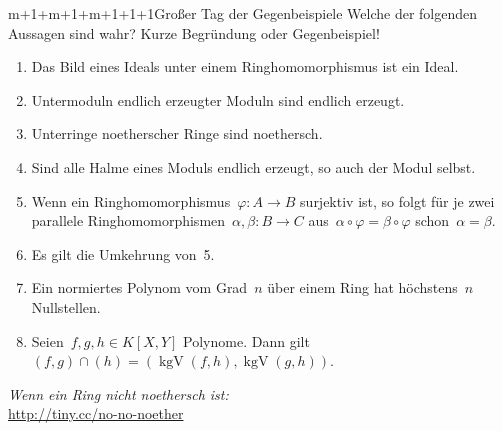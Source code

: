 \documentclass{uebblatt}
\begin{document}
\begin{aufgabe}{m+1+m+1+m+1+1+1}{Großer Tag der Gegenbeispiele}
Welche der folgenden Aussagen sind wahr? Kurze Begründung oder Gegenbeispiel!
\renewcommand{\labelenumi}{\arabic{enumi}.}
\begin{enumerate}
\item Das Bild eines Ideals unter einem Ringhomomorphismus ist ein Ideal.
\item Untermoduln endlich erzeugter Moduln sind endlich erzeugt.
\item Unterringe noetherscher Ringe sind noethersch.
\item Sind alle Halme eines Moduls endlich erzeugt, so auch der Modul selbst.
\item Wenn ein Ringhomomorphismus~$\varphi : A \to B$ surjektiv ist, so folgt
für je zwei parallele Ringhomomorphismen~$\alpha, \beta : B \to C$ aus~$\alpha
\circ \varphi = \beta \circ \varphi$ schon~$\alpha = \beta$.
\item Es gilt die Umkehrung von~5.
\item Ein normiertes Polynom vom Grad~$n$ über einem Ring hat höchstens~$n$
Nullstellen.
\item Seien~$f,g,h \in K[X,Y]$ Polynome. Dann gilt~$(f,g) \cap (h) =
(\operatorname{kgV}(f,h), \operatorname{kgV}(g,h))$.
\end{enumerate}
\end{aufgabe}

\centering
\emph{Wenn ein Ring nicht noethersch ist:} \\
\url{http://tiny.cc/no-no-noether}
\par
\end{document}
